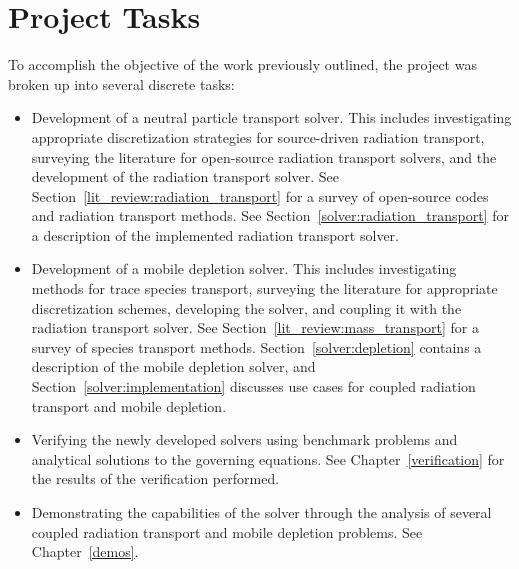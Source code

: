 \section{Project Tasks}
\label{statement_of_work:tasks}
To accomplish the objective of the work previously outlined, the project was broken up into several discrete tasks:
\begin{itemize}
    \item Development of a neutral particle transport solver. This includes investigating appropriate discretization strategies for source-driven radiation transport, surveying the literature for open-source radiation transport solvers, and the development of the radiation transport solver. See Section~\ref{lit_review:radiation_transport} for a survey of open-source codes and radiation transport methods. See Section~\ref{solver:radiation_transport} for a description of the implemented radiation transport solver.
    \item Development of a mobile depletion solver. This includes investigating methods for trace species transport, surveying the literature for appropriate discretization schemes, developing the solver, and coupling it with the radiation transport solver. See Section~\ref{lit_review:mass_transport} for a survey of species transport methods. Section~\ref{solver:depletion} contains a description of the mobile depletion solver, and Section~\ref{solver:implementation} discusses use cases for coupled radiation transport and mobile depletion.
    \item Verifying the newly developed solvers using benchmark problems and analytical solutions to the governing equations. See Chapter~\ref{verification} for the results of the verification performed.
    \item Demonstrating the capabilities of the solver through the analysis of several coupled radiation transport and mobile depletion problems. See Chapter~\ref{demos}.
\end{itemize}